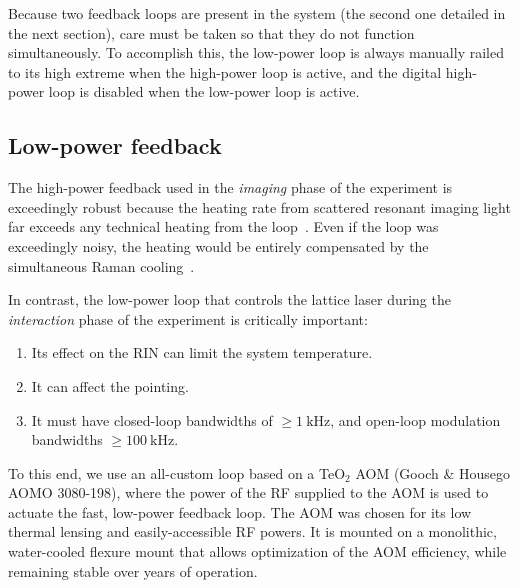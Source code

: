 \documentclass[twocolumn,aps,pra,showpacs,preprintnumbers,bibnotes]{revtex4-1}
\newcommand\unit[2]{\ensuremath{#1~\mathrm{{#2}}}}
\begin{document}
Because two feedback loops are present in the system (the second one detailed in the next section), care must be taken so that they do not function simultaneously.
To accomplish this, the low-power loop is always manually railed to its high extreme when the high-power loop is active, and the digital high-power loop is disabled when the low-power loop is active.

\subsection{Low-power feedback}
The high-power feedback used in the \emph{imaging} phase of the experiment is exceedingly robust because the heating rate from scattered resonant imaging light far exceeds any technical heating from the loop~\cite{Blatt2015}.
Even if the loop was exceedingly noisy, the heating would be entirely compensated by the simultaneous Raman cooling~\cite{Parsons2015}.

In contrast, the low-power loop that controls the lattice laser during the \emph{interaction} phase of the experiment is critically important:
\begin{enumerate}
  \item Its effect on the RIN can limit the system temperature.
  \item It can affect the pointing.
  \item It must have closed-loop bandwidths of $\geq\unit{1}{kHz}$, and open-loop modulation bandwidths $\geq \unit{100}{kHz}$.
\end{enumerate}
To this end, we use an all-custom loop based on a TeO$_2$ AOM (Gooch \& Housego AOMO 3080-198), where the power of the RF supplied to the AOM is used to actuate the fast, low-power feedback loop.
The AOM was chosen for its low thermal lensing and easily-accessible RF powers.
It is mounted on a monolithic, water-cooled flexure mount that allows optimization of the AOM efficiency, while remaining stable over years of operation.
\end{document}
